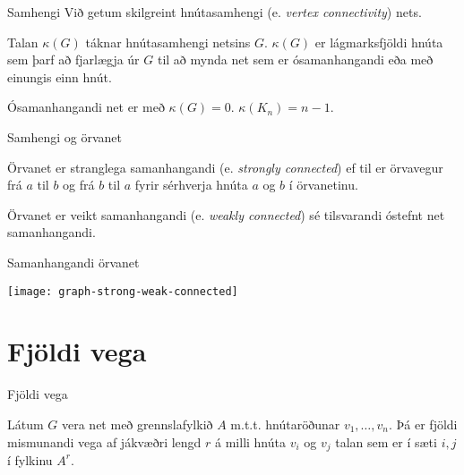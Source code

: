 \documentclass{beamer}
\begin{document}
\begin{frame}{Samhengi}
Við getum skilgreint hnútasamhengi (e. \emph{vertex connectivity}) nets.

\begin{tcolorbox}[title=Samhengi]
Talan $\kappa(G)$ táknar hnútasamhengi netsins $G$. $\kappa(G)$ er lágmarksfjöldi hnúta sem þarf að fjarlægja úr $G$ til að mynda net sem er ósamanhangandi eða með einungis einn hnút.
\end{tcolorbox}
Ósamanhangandi net er með $\kappa(G) = 0$. $\kappa(K_n) = n-1$.
\end{frame}

\begin{frame}{Samhengi og örvanet}
\begin{tcolorbox}[title=Stranglega samanhangandi örvanet]
Örvanet er stranglega samanhangandi (e. \emph{strongly connected}) ef til er örvavegur frá $a$ til $b$ og frá $b$ til $a$ fyrir sérhverja hnúta $a$ og $b$ í örvanetinu.
\end{tcolorbox}

\begin{tcolorbox}[title=Veikt samanhangandi örvanet]
Örvanet er veikt samanhangandi (e. \emph{weakly connected}) sé tilsvarandi óstefnt net samanhangandi.
\end{tcolorbox}
\end{frame}

\begin{frame}{Samanhangandi örvanet}
\begin{center}
\texttt{[image: graph-strong-weak-connected]}
\end{center}
\end{frame}
\section{Fjöldi vega}
\begin{frame}{Fjöldi vega}
\begin{tcolorbox}
Látum $G$ vera net með grennslafylkið $A$ m.t.t. hnútaröðunar $v_1, \ldots, v_n$. Þá er fjöldi mismunandi vega af jákvæðri lengd $r$ á milli hnúta $v_i$ og $v_j$ talan sem er í sæti $i,j$ í fylkinu $A^r$.
\end{tcolorbox}
\end{frame}
\end{document}
